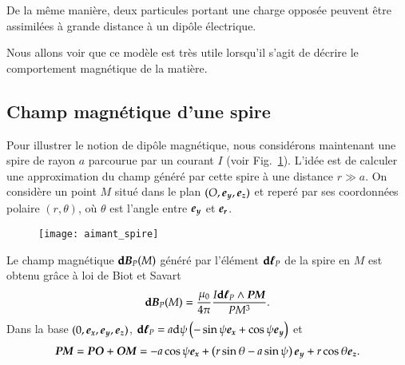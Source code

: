	\begin{rema}
		De la même manière, deux particules portant une charge opposée
		peuvent être assimilées à grande distance à un dipôle électrique.
	\end{rema}
	
	Nous allons voir que ce modèle est très utile lorsqu'il s'agit de décrire
	le comportement magnétique de la matière. 
	
	\subsection{Champ magnétique d'une spire}
	Pour illustrer le notion de dipôle magnétique,
	nous considérons maintenant une spire de rayon $a$ parcourue par un courant $I$
	(voir Fig.~\ref{fig:aimant_spire}).
	L'idée est de calculer une approximation du champ généré par cette spire
	à une distance $r \gg a$. On considère un point $M$ situé dans le plan 
	$(O, \ey, \ez)$ et reperé par ses coordonnées polaire $(r, \theta)$, 
	où $\theta$ est l'angle entre $\ey$ et $\er$.

	\begin{figure}[htpb]
		\centering
		\texttt{[image: aimant\_spire]}
		\caption{}%
		\label{fig:aimant_spire}
	\end{figure}

	Le champ magnétique $\mathrm{\textbf{d}}\vecb_P(M)$ généré par l'élément $\dl_P$ 
	de la spire en $M$ est obtenu grâce à loi de Biot et Savart
	\begin{equation*}
		\mathrm{\textbf{d}}\vecb_P(M) = \dfrac{\mu_0}{4 \pi} 
			\dfrac{I \dl_P \wedge \mitbf{PM}}{PM^3}.
	\end{equation*}
	Dans la base $(0, \ex, \ey, \ez)$, $\dl_P = a \mathrm{d}\psi \left(
	- \sin \psi \ex + \cos \psi \ey \right)$ et
	\begin{equation*}
		\mitbf{PM} = \mitbf{PO} + \mitbf{OM}  
		= -a \cos \psi \ex + \left(r\sin \theta - a \sin \psi\right)\ey +
		     r \cos \theta \ez.
	\end{equation*}
	
